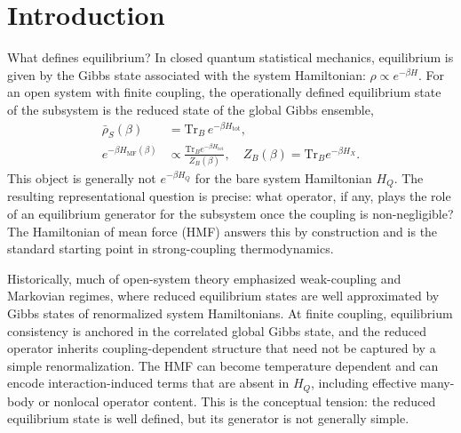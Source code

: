 \section{Introduction}
\label{sec:intro}

What defines equilibrium? In closed quantum statistical mechanics, equilibrium is given by the Gibbs state associated with the system Hamiltonian: $\rho \propto e^{-\beta H}$. For an open system with finite coupling, the operationally defined equilibrium state of the subsystem is the
reduced state of the global Gibbs ensemble,
\begin{align}
    \bar{\rho}_S(\beta)
    &= \mathrm{Tr}_B\, e^{-\beta H_{\mathrm{tot}}},
    \label{eq:intro_rho_unnorm} \\
    e^{-\beta H_{\mathrm{MF}}(\beta)}
    &\propto \frac{\mathrm{Tr}_B e^{-\beta H_{\mathrm{tot}}}}{Z_B(\beta)},
    \quad Z_B(\beta) = \mathrm{Tr}_B e^{-\beta H_X}.
    \label{eq:intro_hmf_def}
\end{align}
This object is generally not $e^{-\beta H_Q}$ for the bare system Hamiltonian
$H_Q$. The resulting representational question is precise: what operator, if
any, plays the role of an equilibrium generator for the subsystem once the
coupling is non-negligible? The Hamiltonian of mean force (HMF) answers this by
construction and is the standard starting point in strong-coupling
thermodynamics\cite{campisiFluctuationTheoremArbitrary2009,talknerColloquiumStatisticalMechanics2020,trushechkinOpenQuantumSystem2022,seifertFirstSecondLaw2016}.

Historically, much of open-system theory emphasized weak-coupling and Markovian
regimes, where reduced equilibrium states are well approximated by Gibbs states
of renormalized system Hamiltonians. At finite coupling, equilibrium
consistency is anchored in the correlated global Gibbs state, and the reduced
operator inherits coupling-dependent structure that need not be captured by a
simple renormalization. The HMF can become temperature dependent and can encode
interaction-induced terms that are absent in $H_Q$, including effective
many-body or nonlocal operator content\cite{talknerColloquiumStatisticalMechanics2020,seifertFirstSecondLaw2016,espositoNatureHeatStrongly2015,hanggiFiniteQuantumDissipation2008,ingoldSpecificHeatAnomalies2009,correaPotentialRenormalisationLamb2025}.
This is the conceptual tension: the reduced equilibrium state is well defined,
but its generator is not generally simple.

